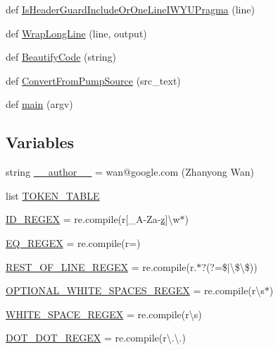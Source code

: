 \begin{DoxyCompactItemize}
\item 
def \mbox{\hyperlink{namespacepump_ac8a553b60dc83d100361a0e98d98451b}{Is\+Header\+Guard\+Include\+Or\+One\+Line\+I\+W\+Y\+U\+Pragma}} (line)
\item 
def \mbox{\hyperlink{namespacepump_a02427e2ddc80f0f408e27dfc3e38e702}{Wrap\+Long\+Line}} (line, output)
\item 
def \mbox{\hyperlink{namespacepump_a3456db8d85605892d670669c4e238cd7}{Beautify\+Code}} (string)
\item 
def \mbox{\hyperlink{namespacepump_a568fe53d1443489ac15bac4a0f9faf91}{Convert\+From\+Pump\+Source}} (src\+\_\+text)
\item 
def \mbox{\hyperlink{namespacepump_abcf26971f7bdbad77c2c168c110312df}{main}} (argv)
\end{DoxyCompactItemize}
\subsection*{Variables}
\begin{DoxyCompactItemize}
\item 
string \mbox{\hyperlink{namespacepump_ab99a065546038823261c774117df0798}{\+\_\+\+\_\+author\+\_\+\+\_\+}} = \textquotesingle{}wan@google.\+com (Zhanyong Wan)\textquotesingle{}
\item 
list \mbox{\hyperlink{namespacepump_a132b35d1104c7f479aa21c345f413477}{T\+O\+K\+E\+N\+\_\+\+T\+A\+B\+LE}}
\item 
\mbox{\hyperlink{namespacepump_a8e008923b6c378b8d3df611fb07d6dda}{I\+D\+\_\+\+R\+E\+G\+EX}} = re.\+compile(r\textquotesingle{}\mbox{[}\+\_\+A-\/Za-\/\mbox{\hyperlink{_obj__test_2lib_2googletest-master_2googlemock_2test_2gmock-matchers__test_8cc_a196ff6a287f53f758b1506f21269fc77}{z}}\mbox{]}\textbackslash{}w$\ast$\textquotesingle{})
\item 
\mbox{\hyperlink{namespacepump_a6397ed9bab62b5c6f60a6626f6b287e0}{E\+Q\+\_\+\+R\+E\+G\+EX}} = re.\+compile(r\textquotesingle{}=\textquotesingle{})
\item 
\mbox{\hyperlink{namespacepump_a4c1f68b32fcb8366051b574cf2e6aef1}{R\+E\+S\+T\+\_\+\+O\+F\+\_\+\+L\+I\+N\+E\+\_\+\+R\+E\+G\+EX}} = re.\+compile(r\textquotesingle{}.$\ast$?(?=\$$\vert$\textbackslash{}\$\textbackslash{}\$)\textquotesingle{})
\item 
\mbox{\hyperlink{namespacepump_a81f03eaffd2c0f4c6a453a0b179e51ca}{O\+P\+T\+I\+O\+N\+A\+L\+\_\+\+W\+H\+I\+T\+E\+\_\+\+S\+P\+A\+C\+E\+S\+\_\+\+R\+E\+G\+EX}} = re.\+compile(r\textquotesingle{}\textbackslash{}s$\ast$\textquotesingle{})
\item 
\mbox{\hyperlink{namespacepump_a4ab1be351870f785a72d324bf56c8316}{W\+H\+I\+T\+E\+\_\+\+S\+P\+A\+C\+E\+\_\+\+R\+E\+G\+EX}} = re.\+compile(r\textquotesingle{}\textbackslash{}s\textquotesingle{})
\item 
\mbox{\hyperlink{namespacepump_a45644ad738e584ec754f6d9f45fe693c}{D\+O\+T\+\_\+\+D\+O\+T\+\_\+\+R\+E\+G\+EX}} = re.\+compile(r\textquotesingle{}\textbackslash{}.\textbackslash{}.\textquotesingle{})
\end{DoxyCompactItemize}


